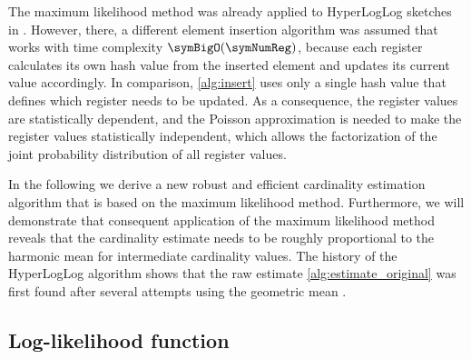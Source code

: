 \documentclass[a4paper]{scrartcl}
\begin{document}
The maximum likelihood method was already applied to HyperLogLog sketches in \cite{Clifford2012}. However, there, a different element insertion algorithm was assumed that works with time complexity $\symBigO(\symNumReg)$, because each register calculates its own hash value from the inserted element and updates its current value accordingly. In comparison, \cref{alg:insert} uses only a single hash value that defines which register needs to be updated. As a consequence, the register values are statistically dependent, and the Poisson approximation is needed to make the register values statistically independent, which allows the factorization of the joint probability distribution of all register values.

In the following we derive a new robust and efficient cardinality estimation algorithm that is based on the maximum likelihood method. Furthermore, we will demonstrate that consequent application of the maximum likelihood method reveals that the cardinality estimate needs to be roughly proportional to the harmonic mean for intermediate cardinality values. The history of the HyperLogLog algorithm shows that the raw estimate \eqref{alg:estimate_original} was first found after several attempts using the geometric mean \cite{Flajolet2007, Durand2003}.

\subsection{Log-likelihood function}
\end{document}
